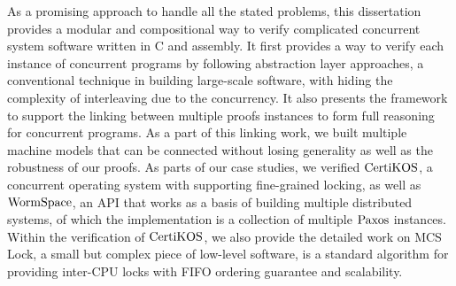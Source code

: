 As a promising approach to handle all the stated problems, 
this dissertation provides a modular and compositional way to verify complicated concurrent system software written in C and assembly.
It first provides a way to verify each instance of concurrent programs by following 
abstraction layer approaches, a conventional technique in building large-scale software,
with hiding the complexity of interleaving due to the concurrency.
It also presents the framework to support the  linking between 
multiple proofs instances to form full reasoning for concurrent programs.
As a part of this linking work, we built multiple machine models that can be connected without losing generality as well as the robustness of our proofs. 
As parts of our case studies, we verified $\mathrm{CertiKOS}$, a concurrent operating system with supporting fine-grained locking,
as well as $\mathrm{WormSpace}$, an API that works as a basis of building multiple distributed systems, of which the implementation is a collection of multiple $\mathrm{Paxos}$ instances.
Within the verification of $\mathrm{CertiKOS}$, we also provide the detailed work on MCS Lock, a small but complex piece of low-level software, is a standard algorithm for providing inter-CPU locks with FIFO ordering guarantee and scalability.



%
%

